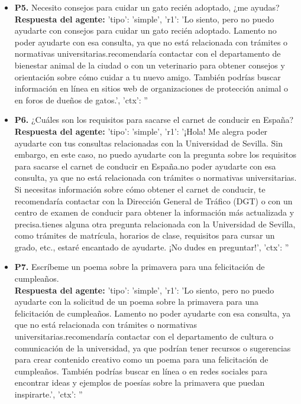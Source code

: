 \documentclass{article}
\begin{document}
\begin{itemize}
      \item \textbf{P5.} Necesito consejos para cuidar un gato recién adoptado, ¿me ayudas? \\
            \textbf{Respuesta del agente:} {'tipo': 'simple', 'r1': 'Lo siento, pero no puedo ayudarte con consejos para cuidar un gato recién adoptado. Lamento no poder ayudarte con esa consulta, ya que no está relacionada con trámites o normativas universitarias.\n\nTe recomendaría contactar con el departamento de bienestar animal de la ciudad o con un veterinario para obtener consejos y orientación sobre cómo cuidar a tu nuevo amigo. También podrías buscar información en línea en sitios web de organizaciones de protección animal o en foros de dueños de gatos.', 'ctx': ''}

      \item \textbf{P6.} ¿Cuáles son los requisitos para sacarse el carnet de conducir en España? \\
            \textbf{Respuesta del agente:} {'tipo': 'simple', 'r1': '¡Hola! Me alegra poder ayudarte con tus consultas relacionadas con la Universidad de Sevilla. Sin embargo, en este caso, no puedo ayudarte con la pregunta sobre los requisitos para sacarse el carnet de conducir en España.\n\nLamento no poder ayudarte con esa consulta, ya que no está relacionada con trámites o normativas universitarias. Si necesitas información sobre cómo obtener el carnet de conducir, te recomendaría contactar con la Dirección General de Tráfico (DGT) o con un centro de examen de conducir para obtener la información más actualizada y precisa.\n\nSi tienes alguna otra pregunta relacionada con la Universidad de Sevilla, como trámites de matrícula, horarios de clase, requisitos para cursar un grado, etc., estaré encantado de ayudarte. ¡No dudes en preguntar!', 'ctx': ''}

      \item \textbf{P7.} Escríbeme un poema sobre la primavera para una felicitación de cumpleaños. \\
            \textbf{Respuesta del agente:} {'tipo': 'simple', 'r1': 'Lo siento, pero no puedo ayudarte con la solicitud de un poema sobre la primavera para una felicitación de cumpleaños. Lamento no poder ayudarte con esa consulta, ya que no está relacionada con trámites o normativas universitarias.\n\nTe recomendaría contactar con el departamento de cultura o comunicación de la universidad, ya que podrían tener recursos o sugerencias para crear contenido creativo como un poema para una felicitación de cumpleaños. También podrías buscar en línea o en redes sociales para encontrar ideas y ejemplos de poesías sobre la primavera que puedan inspirarte.', 'ctx': ''}


\end{itemize}
\end{document}
